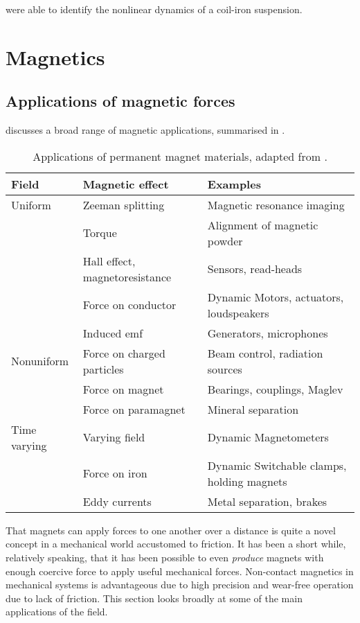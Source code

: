 \textcite{agamennoni2004} were able to identify the nonlinear dynamics
of a coil-iron suspension.

\section{Magnetics}

\subsection{Applications of magnetic forces}

\textcite{coey2002} discusses a broad range of magnetic applications,
summarised in .

\begin{table}
\begin{wide}
\begin{tabular}{@{}lll@{}}
\toprule
Field & Magnetic effect & Examples \\
\midrule
Uniform & Zeeman splitting & Magnetic resonance imaging \\
& Torque & Alignment of magnetic powder \\
& Hall effect, magnetoresistance & Sensors, read-heads \\
& Force on conductor & Dynamic Motors, actuators, loudspeakers \\
& Induced emf & Generators, microphones \\
Nonuniform & Force on charged particles & Beam control, 
radiation sources %
\\
& Force on magnet & Bearings, couplings, Maglev \\
& Force on paramagnet & Mineral separation \\
Time varying & Varying field & Dynamic Magnetometers \\
& Force on iron & Dynamic Switchable clamps, holding magnets \\
& Eddy currents & Metal separation, brakes \\
\bottomrule
\end{tabular}
\end{wide}
\caption{Applications of permanent magnet materials, 
adapted from \textcite{coey2002}.}
\end{table}

That magnets can apply forces to one another over a distance is quite a novel
concept in a mechanical world accustomed to friction. It has been a short
while, relatively speaking, that it has been possible to even \emph{produce}
magnets with enough coercive force to apply useful mechanical forces.
Non-contact magnetics in mechanical systems is advantageous due to high
precision and wear-free operation due to lack of friction. This section looks
broadly at some of the main applications of the field.


